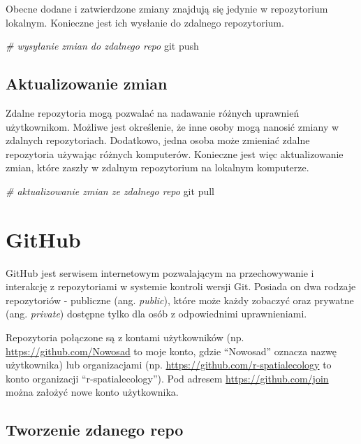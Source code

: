 \documentclass[paper=6in:9in,pagesize=pdftex,headinclude=on,footinclude=on,10pt]{scrbook}
\newenvironment{Shaded}{\begin{snugshade}}{\end{snugshade}}
\newcommand{\CommentTok}[1]{\textcolor[rgb]{0.56,0.35,0.01}{\textit{#1}}}
\newcommand{\FunctionTok}[1]{\textcolor[rgb]{0.00,0.00,0.00}{#1}}
\newcommand{\NormalTok}[1]{#1}
\begin{document}
Obecne dodane i zatwierdzone zmiany znajdują się jedynie w repozytorium lokalnym.
Konieczne jest ich wysłanie do zdalnego repozytorium.

\begin{Shaded}
\begin{Highlighting}[]
\CommentTok{# wysyłanie zmian do zdalnego repo}
\FunctionTok{git}\NormalTok{ push}
\end{Highlighting}
\end{Shaded}

\hypertarget{aktualizowanie-zmian}{%
\subsection{Aktualizowanie zmian}\label{aktualizowanie-zmian}}

Zdalne repozytoria mogą pozwalać na nadawanie różnych uprawnień użytkownikom.
Możliwe jest określenie, że inne osoby mogą nanosić zmiany w zdalnych repozytoriach.
Dodatkowo, jedna osoba może zmieniać zdalne repozytoria używając różnych komputerów.
Konieczne jest więc aktualizowanie zmian, które zaszły w zdalnym repozytorium na lokalnym komputerze.

\begin{Shaded}
\begin{Highlighting}[]
\CommentTok{# aktualizowanie zmian ze zdalnego repo}
\FunctionTok{git}\NormalTok{ pull}
\end{Highlighting}
\end{Shaded}

\hypertarget{github}{%
\section{GitHub}\label{github}}

GitHub jest serwisem internetowym pozwalającym na przechowywanie i interakcję z repozytoriami w systemie kontroli wersji Git.
Posiada on dwa rodzaje repozytoriów - publiczne (ang. \emph{public}), które może każdy zobaczyć oraz prywatne (ang. \emph{private}) dostępne tylko dla osób z odpowiednimi uprawnieniami.

Repozytoria połączone są z kontami użytkowników (np. \url{https://github.com/Nowosad} to moje konto, gdzie ``Nowosad'' oznacza nazwę użytkownika) lub organizacjami (np. \url{https://github.com/r-spatialecology} to konto organizacji ``r-spatialecology'').
Pod adresem \url{https://github.com/join} można założyć nowe konto użytkownika.

\hypertarget{tworzenie-zdanego-repo}{%
\subsection{Tworzenie zdanego repo}\label{tworzenie-zdanego-repo}}
\end{document}
